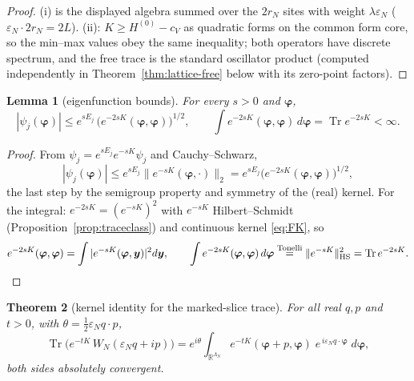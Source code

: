 \documentclass[11pt,a4paper]{article}
\theoremstyle{plain}
\newtheorem{theorem}{Theorem}[section]
\newtheorem{lemma}[theorem]{Lemma}
\theoremstyle{definition}
\newcommand{\R}{\mathbb{R}}
\newcommand{\eps}{\varepsilon}
\DeclareMathOperator{\Trace}{Tr}
\begin{document}
\begin{proof}
(i) is the displayed algebra summed over the $2r_N$ sites with weight
$\lambda\eps_N$ ($\eps_N\cdot2r_N=2L$). (ii): $K\ge H^{(0)}-c_V$ as quadratic
forms on the common form core, so the min--max values obey the same
inequality; both operators have discrete spectrum, and the free trace is the
standard oscillator product (computed independently in
Theorem~\ref{thm:lattice-free} below with its zero-point factors).
\end{proof}

\begin{lemma}[eigenfunction bounds]\label{lem:efbound}
For every $s>0$ and $\bm\varphi$,
\[
 |\psi_j(\bm\varphi)|\le e^{sE_j}\,
 \bigl(e^{-2sK}(\bm\varphi,\bm\varphi)\bigr)^{1/2},
 \qquad
 \int e^{-2sK}(\bm\varphi,\bm\varphi)\,d\bm\varphi=\Trace e^{-2sK}<\infty .
\]
\end{lemma}

\begin{proof}
From $\psi_j=e^{sE_j}e^{-sK}\psi_j$ and Cauchy--Schwarz,
\[
 |\psi_j(\bm\varphi)|\le e^{sE_j}\|e^{-sK}(\bm\varphi,\cdot)\|_2
 =e^{sE_j}\bigl(e^{-2sK}(\bm\varphi,\bm\varphi)\bigr)^{1/2},
\]
the last step by the semigroup property and symmetry of the (real) kernel. For the integral:
$e^{-2sK}=(e^{-sK})^2$ with $e^{-sK}$ Hilbert--Schmidt
(Proposition~\ref{prop:traceclass}) and continuous kernel \eqref{eq:FK}, so
\[
 e^{-2sK}(\bm\varphi,\bm\varphi)=\int|e^{-sK}(\bm\varphi,\bm y)|^2d\bm y,
 \qquad
 \int e^{-2sK}(\bm\varphi,\bm\varphi)\,d\bm\varphi
 \overset{\rm Tonelli}{=}\|e^{-sK}\|_{\rm HS}^2
 =\Trace e^{-2sK} .
\]
\end{proof}

\begin{theorem}[kernel identity for the marked-slice trace]\label{thm:kernel}
For all real $q,p$ and $t>0$, with $\theta=\tfrac12\eps_Nq\cdot p$,
\begin{equation}
 \Trace\bigl(e^{-tK}\,W_N(\eps_Nq+ip)\bigr)
 =e^{i\theta}\int_{\R^{\Lambda_N}}
 e^{-tK}(\bm\varphi+p,\bm\varphi)\;
 e^{\,i\eps_N q\cdot\bm\varphi}\;d\bm\varphi ,
 \label{eq:kernelid}
\end{equation}
both sides absolutely convergent.
\end{theorem}
\end{document}
